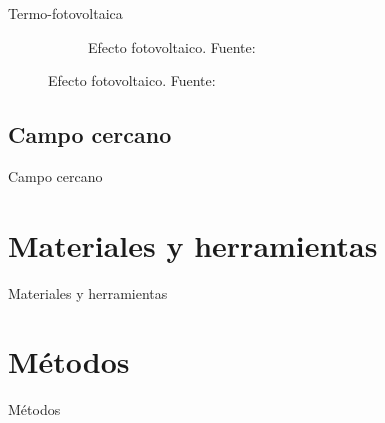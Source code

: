 \documentclass[spanish,a4paper]{beamer}%
\begin{document}
\begin{frame}{Termo-fotovoltaica}
\begin{figure}[ht]
{\begin{subfigure}[b]{0.4\textwidth}
				\caption*{Efecto fotovoltaico. Fuente: \cite{thermophotovoltaic_40}}
				\label{fig:PV_Effect}
			\end{subfigure}
			}
		\label{fig:TPV}
		\end{figure}
		
	\end{frame}
	\subsection{Campo cercano}
	\begin{frame}{Campo cercano}
		
	\end{frame}
	\section{Materiales y herramientas}
	\begin{frame}{Materiales y herramientas}
		
	\end{frame}


	\section{Métodos}
	\begin{frame}{Métodos}
		
	\end{frame}
\end{document}
